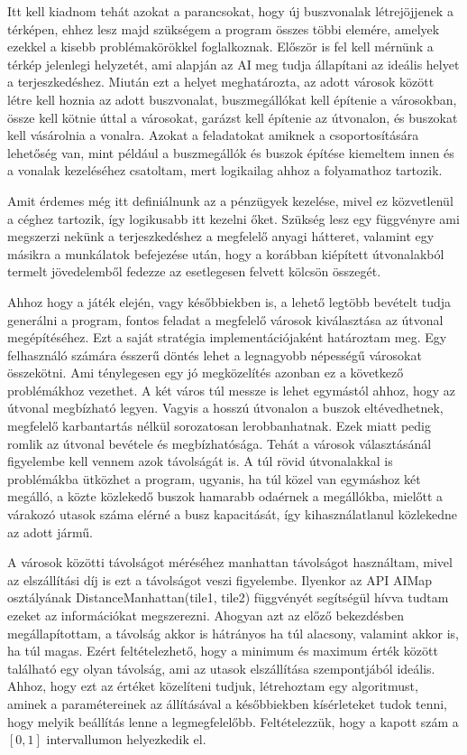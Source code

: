 Itt kell kiadnom tehát azokat a parancsokat, hogy új buszvonalak létrejöjjenek a térképen, ehhez lesz majd szükségem a program összes többi elemére, amelyek ezekkel a kisebb problémakörökkel foglalkoznak. Először is fel kell mérnünk a térkép jelenlegi helyzetét, ami alapján az AI meg tudja állapítani az ideális helyet a terjeszkedéshez. Miután ezt a helyet meghatározta, az adott városok között létre kell hoznia az adott buszvonalat, buszmegállókat kell építenie a városokban, össze kell kötnie úttal a városokat, garázst kell építenie az útvonalon, és buszokat kell vásárolnia a vonalra. Azokat a feladatokat amiknek a csoportosítására lehetőség van, mint például a buszmegállók és buszok építése kiemeltem innen és a vonalak kezeléséhez csatoltam, mert logikailag ahhoz a folyamathoz tartozik.

Amit érdemes még itt definiálnunk az a pénzügyek kezelése, mivel ez közvetlenül a céghez tartozik, így logikusabb itt kezelni őket. Szükség lesz egy függvényre ami megszerzi nekünk a terjeszkedéshez a megfelelő anyagi hátteret, valamint egy másikra a munkálatok befejezése után, hogy a korábban kiépített útvonalakból termelt jövedelemből fedezze az esetlegesen felvett kölcsön összegét.


Ahhoz hogy a játék elején, vagy későbbiekben is, a lehető legtöbb bevételt tudja generálni a program, fontos feladat a megfelelő városok kiválasztása az útvonal megépítéséhez. Ezt a saját stratégia implementációjaként határoztam meg. Egy felhasználó számára ésszerű döntés lehet a legnagyobb népességű városokat összekötni. Ami ténylegesen egy jó megközelítés azonban ez a következő problémákhoz vezethet. A két város túl messze is lehet egymástól ahhoz, hogy az útvonal megbízható legyen. Vagyis a hosszú útvonalon a buszok eltévedhetnek, megfelelő karbantartás nélkül sorozatosan lerobbanhatnak. Ezek miatt pedig romlik az útvonal bevétele és megbízhatósága. Tehát a városok választásánál figyelembe kell vennem azok távolságát is. A túl rövid útvonalakkal is problémákba ütközhet a program, ugyanis, ha túl közel van egymáshoz két megálló, a közte közlekedő buszok hamarabb odaérnek a megállókba, mielőtt a várakozó utasok száma elérné a busz kapacitását, így kihasználatlanul közlekedne az adott jármű.

A városok közötti távolságot méréséhez manhattan távolságot használtam, mivel az elszállítási díj is ezt a távolságot veszi figyelembe. Ilyenkor az API AIMap osztályának DistanceManhattan(tile1, tile2) függvényét segítségül hívva tudtam ezeket az információkat megszerezni. Ahogyan azt az előző bekezdésben megállapítottam, a távolság akkor is hátrányos ha túl alacsony, valamint akkor is, ha túl magas. Ezért feltételezhető, hogy a minimum és maximum érték között található egy olyan távolság, ami az utasok elszállítása szempontjából ideális. Ahhoz, hogy ezt az értéket közelíteni tudjuk, létrehoztam egy algoritmust, aminek a paramétereinek az állításával a későbbiekben kísérleteket tudok tenni, hogy melyik beállítás lenne a legmegfelelőbb. Feltételezzük, hogy a kapott szám a $[0, 1]$ intervallumon helyezkedik el.

